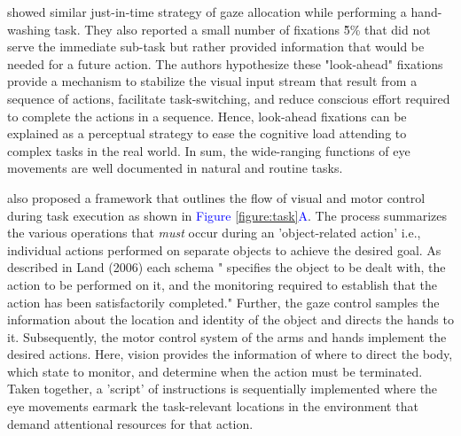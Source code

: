 \citet{Pelz2001-cn} showed similar just-in-time strategy of gaze allocation while performing a hand-washing task. They also reported a small number of fixations \~5\% that did not serve the immediate sub-task but rather provided information that would be needed for a future action. The authors hypothesize these "look-ahead" fixations provide a mechanism to stabilize the visual input stream that result from a sequence of actions, facilitate task-switching, and reduce conscious effort required to complete the actions in a sequence. Hence, look-ahead fixations can be explained as a perceptual strategy to ease the cognitive load attending to complex tasks in the real world. In sum, the wide-ranging functions of eye movements are well documented in natural and routine tasks.

\citet{Land2001-do} also proposed a framework that outlines the flow of visual and motor control during task execution as shown in \textcolor{Blue}{Figure \ref{figure:task}A}. The process summarizes the various operations that \emph{must} occur during an 'object-related action' i.e., individual actions performed on separate objects to achieve the desired goal. As described in Land (2006) each schema " specifies the object to be dealt with, the action to be performed on it, and the monitoring required to establish that the action has been satisfactorily completed." Further, the gaze control samples the information about the location and identity of the object and directs the hands to it. Subsequently, the motor control system of the arms and hands implement the desired actions. Here, vision provides the information of where to direct the body, which state to monitor, and determine when the action must be terminated. Taken together, a 'script' of instructions is sequentially implemented where the eye movements earmark the task-relevant locations in the environment that demand attentional resources for that action.


